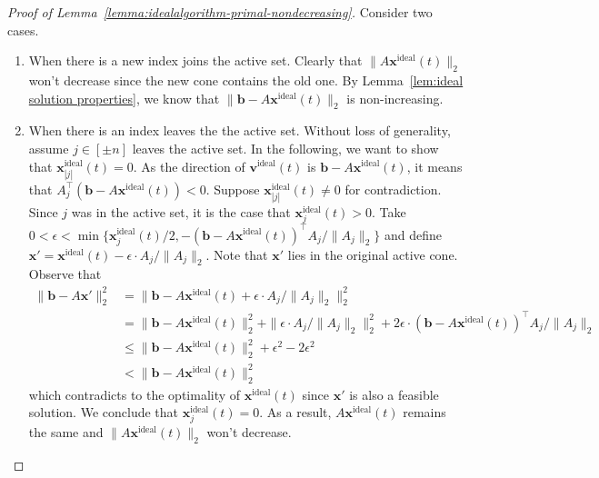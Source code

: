 \documentclass[11pt]{article}
\theoremstyle{remark}
\theoremstyle{definition}
\newcommand{\bx}{\mathbf{x}}
\newcommand{\bb}{\mathbf{b}}
\newcommand{\bv}{\mathbf{v}}
\begin{document}
\begin{proof}[Proof of Lemma~\ref{lemma:idealalgorithm-primal-nondecreasing}]
	Consider two cases.
	\begin{enumerate}[label=(\arabic*)]
		\item When there is a new index joins the active set. Clearly that $\|A\bx^{\text{ideal}}(t)\|_2$ won't decrease since the new cone contains the old one. By Lemma~\ref{lem:ideal solution properties}, we know that $\|\bb-A\bx^{\text{ideal}}(t)\|_2$ is non-increasing.
		\item When there is an index leaves the the active set. Without loss of generality, assume $j\in[\pm n]$ leaves the active set. In the following, we want to show that $\bx^{\text{ideal}}_{|j|}(t)=0$. As the direction of $\bv^{\text{ideal}}(t)$ is $\bb-A\bx^{\text{ideal}}(t)$, it means that $A_j^{\top}(\bb-A\bx^{\text{ideal}}(t))<0$. Suppose $\bx^{\text{ideal}}_{|j|}(t)\neq0$ for contradiction. Since $j$ was in the active set, it is the case that $\bx^{\text{ideal}}_j(t)>0$. Take $0<\epsilon<\min\{\bx^{\text{ideal}}_j(t)/2,-(\bb-A\bx^{\text{ideal}}(t))^{\top}A_j/\|A_j\|_2\}$ and define $\bx'=\bx^{\text{ideal}}(t) - \epsilon\cdot A_j/\|A_j\|_2$. Note that $\bx'$ lies in the original active cone. Observe that
		\begin{align*}
		\|\bb-A\bx'\|_2^2 &= \|\bb-A\bx^{\text{ideal}}(t) + \epsilon\cdot A_j/\|A_j\|_2\|_2^2\\
		&=\|\bb-A\bx^{\text{ideal}}(t)\|_2^2 + \|\epsilon\cdot A_j/\|A_j\|_2\|_2^2+2\epsilon\cdot(\bb-A\bx^{\text{ideal}}(t))^{\top}A_j/\|A_j\|_2\\
		&\leq\|\bb-A\bx^{\text{ideal}}(t)\|_2^2 + \epsilon^2 - 2\epsilon^2\\
		&<\|\bb-A\bx^{\text{ideal}}(t)\|_2^2
		\end{align*}
		which contradicts to the optimality of $\bx^{\text{ideal}}(t)$ since $\bx'$ is also a feasible solution. We conclude that $\bx^{\text{ideal}}_j(t)=0$. As a result, $A\bx^{\text{ideal}}(t)$ remains the same and $\|A\bx^{\text{ideal}}(t)\|_2$ won't decrease.
	\end{enumerate}
\end{proof}
\end{document}
